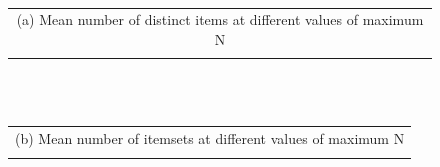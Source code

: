 \documentclass[letterpaper,12pt,titlepage,oneside,final]{book}
\begin{document}
\begin{figure}
\centering
{}
\\
\begin{tabular}{c}
\\(a) Mean number of distinct items at different values of maximum N \\ \\
\end{tabular}
\\
{}
\\
\begin{tabular}{c}
\\(b) Mean number of itemsets at different values of maximum N \\ \\
\end{tabular}
\\

\end{figure}
\end{document}

